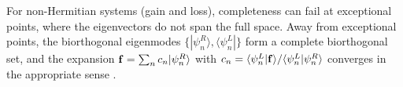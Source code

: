 For non-Hermitian systems (gain and loss), completeness can fail at
exceptional points, where the eigenvectors do not span the full
space.  Away from exceptional points, the biorthogonal eigenmodes
$\{|\psi_n^R\rangle,\langle\psi_n^L|\}$ form a complete biorthogonal
set, and the expansion $\mathbf{f}=\sum_n c_n|\psi_n^R\rangle$ with
$c_n=\langle\psi_n^L|\mathbf{f}\rangle/\langle\psi_n^L|\psi_n^R\rangle$
converges in the appropriate sense
\cite{kunst2018biorthogonal,shen2017topological}.
